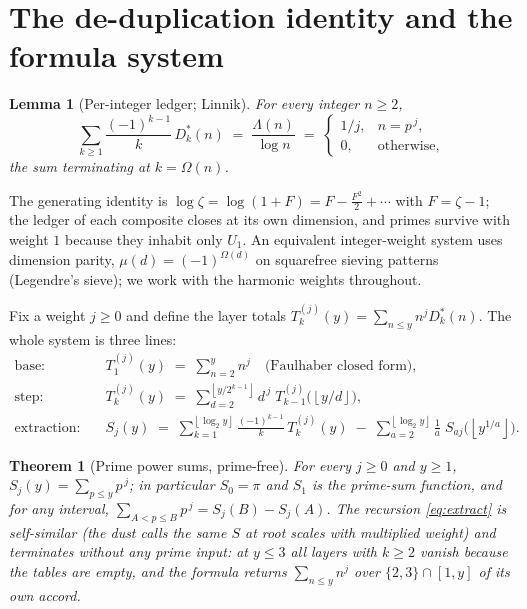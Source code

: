 \documentclass[11pt]{article}
\newtheorem{lemma}{Lemma}
\newtheorem{theorem}{Theorem}
\theoremstyle{remark}
\newcommand{\fl}[1]{\left\lfloor #1 \right\rfloor}
\begin{document}
\section{The de-duplication identity and the formula system}

\begin{lemma}[Per-integer ledger; Linnik]\label{lem:linnik}
For every integer $n \ge 2$,
\[
\sum_{k \ge 1} \frac{(-1)^{k-1}}{k}\, D_k^*(n) \;=\; \frac{\Lambda(n)}{\log n} \;=\;
\begin{cases} 1/j, & n = p^{\,j},\\ 0, & \text{otherwise,}\end{cases}
\]
the sum terminating at $k = \Omega(n)$.
\end{lemma}

The generating identity is $\log \zeta = \log(1 + F) = F - \tfrac{F^2}{2} + \cdots$ with
$F = \zeta - 1$; the ledger of each composite closes at its own dimension, and primes survive with
weight $1$ because they inhabit only $U_1$. An equivalent integer-weight system uses dimension parity,
$\mu(d) = (-1)^{\Omega(d)}$ on squarefree sieving patterns (Legendre's sieve); we work with the harmonic
weights throughout.

Fix a weight $j \ge 0$ and define the layer totals $T_k^{(j)}(y) = \sum_{n \le y} n^j D_k^*(n)$. The
whole system is three lines:
\begin{align}
\text{base:}\quad & T_1^{(j)}(y) \;=\; \textstyle\sum_{n=2}^{y} n^j \quad\text{(Faulhaber closed form)},\label{eq:base}\\
\text{step:}\quad & T_k^{(j)}(y) \;=\; \sum_{d=2}^{\fl{y/2^{k-1}}} d^{\,j}\; T_{k-1}^{(j)}\big(\fl{y/d}\big),\label{eq:step}\\
\text{extraction:}\quad & S_j(y) \;=\; \sum_{k=1}^{\fl{\log_2 y}} \frac{(-1)^{k-1}}{k}\, T_k^{(j)}(y)
\;-\; \sum_{a=2}^{\fl{\log_2 y}} \frac{1}{a}\; S_{a j}\big(\fl{y^{1/a}}\big).\label{eq:extract}
\end{align}

\begin{theorem}[Prime power sums, prime-free]\label{thm:main}
For every $j \ge 0$ and $y \ge 1$, $S_j(y) = \sum_{p \le y} p^{\,j}$; in particular $S_0 = \pi$ and
$S_1$ is the prime-sum function, and for any interval,
$\sum_{A < p \le B} p^{\,j} = S_j(B) - S_j(A)$. The recursion \eqref{eq:extract} is self-similar (the
dust calls the same $S$ at root scales with multiplied weight) and terminates without any prime input:
at $y \le 3$ all layers with $k \ge 2$ vanish because the tables are empty, and the formula returns
$\sum_{n \le y} n^j$ over $\{2, 3\} \cap [1, y]$ of its own accord.
\end{theorem}
\end{document}
